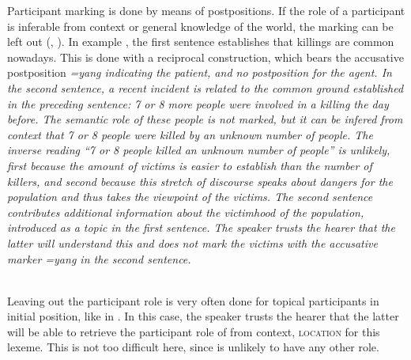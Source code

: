 Participant marking is done by means of postpositions.  If the role of a participant is inferable from context or general knowledge of the world, the marking can be left out (\citet[26]{Ansaldo2005ms}, \citet[31]{Ansaldo2008genesis}). In example , the first sentence establishes that killings are common nowadays. This is done with a reciprocal construction, which bears the accusative postposition \em =yang \em indicating the patient, and no postposition for the agent. In the second sentence, a recent incident is related to the common ground established in the preceding sentence: 7 or 8 more people were involved in a killing the day before. The semantic role of these people is not marked, but it can be infered from context that 7 or 8 people were killed by an unknown number of people. The inverse reading ``7 or 8 people killed an unknown number of people'' is unlikely, first because the amount of victims is easier to establish than the number of killers, and second because this stretch of discourse speaks about dangers for the population and thus takes the viewpoint of the victims. The second sentence contributes additional information about the victimhood of the population, introduced as a topic in the first sentence. The speaker trusts the hearer that the latter will understand this and does not mark the victims with the accusative marker \em =yang \em in the second sentence.

 \\
Leaving out the participant role is very often done for topical participants in initial position, like  in . In this case, the speaker trusts the hearer that the latter will be able to retrieve the participant role of  from context, \textsc{location} for this lexeme. This is not too difficult here, since  is unlikely to have any other role.

